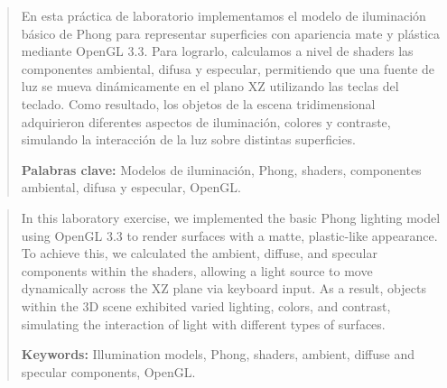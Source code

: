 
\begin{abstract}
En esta práctica de laboratorio implementamos el modelo de iluminación básico de Phong para representar superficies con apariencia mate y plástica mediante OpenGL 3.3. Para lograrlo, calculamos a nivel de shaders las componentes ambiental, difusa y especular, permitiendo que una fuente de luz se mueva dinámicamente en el plano XZ utilizando las teclas del teclado. Como resultado, los objetos de la escena tridimensional adquirieron diferentes aspectos de iluminación, colores y contraste, simulando la interacción de la luz sobre distintas superficies.
 
\vspace{0.3cm}
\noindent\textbf{Palabras clave:} Modelos de iluminación, Phong, shaders, componentes ambiental, difusa y especular, OpenGL.
\end{abstract}

\vspace{0.5cm}

\renewcommand{\abstractname}{Abstract}
\begin{abstract}
In this laboratory exercise, we implemented the basic Phong lighting model using OpenGL 3.3 to render surfaces with a matte, plastic-like appearance. To achieve this, we calculated the ambient, diffuse, and specular components within the shaders, allowing a light source to move dynamically across the XZ plane via keyboard input. As a result, objects within the 3D scene exhibited varied lighting, colors, and contrast, simulating the interaction of light with different types of surfaces.

\vspace{0.3cm}
\noindent\textbf{Keywords:} Illumination models, Phong, shaders, ambient, diffuse and specular components, OpenGL.
\end{abstract}

\vspace{0.6cm}
